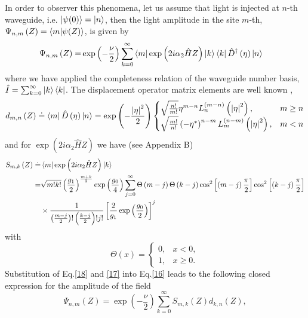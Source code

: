 \documentclass[12pt]{article}
\numberwithin{equation}{section}
\begin{document}
In order to observer this phenomena, let us assume that light is injected at $n$-th waveguide, i.e. $\ket{\psi(0)}=\ket{n}$, then the light amplitude in the site $m$-th, $\Psi_{n,m}\left(Z \right)=\braket{m}{\psi(Z)}$, is given by
\begin{align} \label{16}
\Psi_{n,m}\left(Z \right)=& \exp\left(-\frac{\nu}{2}\right) \sum_{k=0}^{\infty} \bra{m} \exp\left( 2 i \alpha_{2}\hat{H} Z \right) \ket{k}\bra{k} \hat{D}^{\dagger}\left( \eta \right) \ket{n}
\end{align}
where we have applied the completeness relation of the waveguide number basis, $\hat{I}=\sum_{k=0}^{\infty} \ket{k}\bra{k}$. The displacement operator matrix elements are well known \cite{vogel},
\begin{equation} \label{17}
d_{m,n}\left(Z\right) \doteq\bra{m}\hat{D}\left(\eta \right)\ket{n}=\exp\left( -\frac{\abs{\eta}^2}{2}\right)
\begin{cases}
\sqrt{\frac{n!}{m!}}\eta^{m-n}L_n^{\left(m-n \right) }\left( \abs{\eta}^2\right), & m\geq n
\\
\sqrt{\frac{m!}{n!}}\left(-\eta^*\right)^{n-m} L_m^{\left(n-m \right) }\left( \abs{\eta}^2\right), & m<n
\end{cases}
\end{equation}
and for $\exp\left( 2 i \alpha_{2}\hat{H} Z \right)$ we have (see Appendix B)
\begin{align} \label{18}
S_{m,k}\left(Z\right)\doteq&\bra{m} \exp\left( 2 i \alpha_{2}\hat{H} Z \right) \ket{k}
\nonumber \\ 
=&\sqrt{m!k!}\left(\frac{g_1}{2} \right) ^{\frac{m+k}{2}} \exp\left(\frac{g_0}{4} \right) 
\sum_{j=0}^{\infty} \Theta\left(m-j \right)  \Theta\left(k-j \right) 
\cos^2\left[\left(m-j \right)\frac{\pi}{2}  \right] \cos^2\left[\left(k-j \right)\frac{\pi}{2}  \right]
\nonumber \\ & \times
\frac{1}{\left(\frac{m-j}{2} \right) ! \left(\frac{k-j}{2} \right) ! j!}\left[ \frac{2}{g_1} \exp\left(\frac{g_0}{2} \right) \right]^j 
\end{align}
with
\begin{equation} \label{19}
\Theta(x)=
\begin{cases}
0, & x<0,\\
1, & x \geq 0.
\end{cases}
\end{equation}
Substitution of Eq.\eqref{18} and \eqref{17} into Eq.\eqref{16} leads to the following closed expression for the amplitude of the field
\begin{equation}\label{20}
\Psi_{n,m}\left(Z \right)=\exp\left( -\frac{\nu}{2}\right)
\sum_{k=0}^{\infty}S_{m,k}\left(Z\right) d_{k,n}\left(Z\right),
\end{equation}
\end{document}
